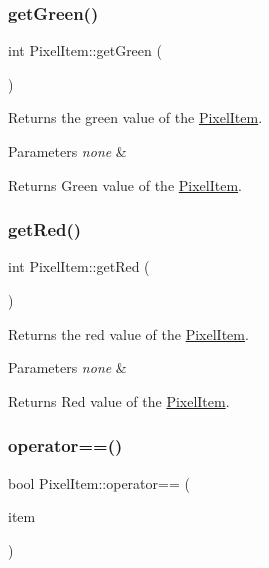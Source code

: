 \subsubsection{\texorpdfstring{get\+Green()}{getGreen()}}
{\footnotesize\ttfamily int Pixel\+Item\+::get\+Green (\begin{DoxyParamCaption}{ }\end{DoxyParamCaption})}

Returns the green value of the \hyperlink{class_pixel_item}{Pixel\+Item}.


\begin{DoxyParams}{Parameters}
{\em none} & \\
\hline
\end{DoxyParams}
\begin{DoxyReturn}{Returns}
Green value of the \hyperlink{class_pixel_item}{Pixel\+Item}. 
\end{DoxyReturn}
\mbox{\label{class_pixel_item_a0e41732aa80899aa090d4393434082f0}} 
\subsubsection{\texorpdfstring{get\+Red()}{getRed()}}
{\footnotesize\ttfamily int Pixel\+Item\+::get\+Red (\begin{DoxyParamCaption}{ }\end{DoxyParamCaption})}

Returns the red value of the \hyperlink{class_pixel_item}{Pixel\+Item}.


\begin{DoxyParams}{Parameters}
{\em none} & \\
\hline
\end{DoxyParams}
\begin{DoxyReturn}{Returns}
Red value of the \hyperlink{class_pixel_item}{Pixel\+Item}. 
\end{DoxyReturn}
\mbox{\label{class_pixel_item_a8d15364c83253dabf97324e82151f8cb}} 
\subsubsection{\texorpdfstring{operator==()}{operator==()}}
{\footnotesize\ttfamily bool Pixel\+Item\+::operator== (\begin{DoxyParamCaption}\item[{\hyperlink{class_pixel_item}{Pixel\+Item} \&}]{item }\end{DoxyParamCaption})}

